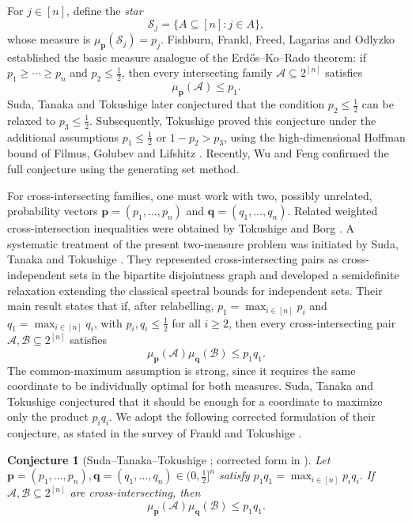 \documentclass[11pt]{article}
\numberwithin{equation}{section}
\newtheorem{conjecture}[theorem]{Conjecture}
\theoremstyle{definition}
\theoremstyle{remark}
\begin{document}
For $j\in[n]$, define the \textit{star}
$$
 \mathcal{S}_j=\{A\subseteq[n]:j\in A\},
$$
whose measure is
$
 \mu_{\mathbf p}(\mathcal{S}_j)=p_j.
$
Fishburn, Frankl, Freed, Lagarias and Odlyzko \cite{FishburnEtAl} established the basic measure analogue of the Erd\H{o}s--Ko--Rado theorem: if  $p_1\ge\cdots\ge p_n$ and $p_2\le \frac{1}{2}$, then  every intersecting family $\mathcal{A}\subseteq2^{[n]}$ satisfies
\begin{equation*}
 \mu_{\mathbf p}(\mathcal{A})\leq p_1.
\end{equation*}
Suda, Tanaka and Tokushige \cite{STT} later conjectured that the condition $p_2\le \frac{1}{2}$ can be relaxed to $p_3\le \frac{1}{2}$.  Subsequently, Tokushige \cite{T22} proved this conjecture under the additional assumptions $p_1\le\frac{1}{2}$ or $1-p_2>p_3$, using the high-dimensional Hoffman bound of Filmus, Golubev and Lifshitz \cite{F21}. Recently, Wu and Feng \cite{W26} confirmed the full conjecture using the generating set method.




For cross-intersecting families, one must work with two, possibly unrelated, probability vectors
$
 \mathbf p=(p_1,\ldots,p_n)
$
and 
$
 \mathbf q=(q_1,\ldots,q_n).
$
Related weighted cross-intersection inequalities were obtained by Tokushige \cite{Tokushige} and Borg \cite{Borg}. A systematic treatment of the present two-measure problem was initiated by Suda, Tanaka and Tokushige \cite{STT}. They represented cross-intersecting pairs as cross-independent sets in the bipartite disjointness graph and developed a semidefinite relaxation extending the classical spectral bounds for independent sets.
Their main result states that if, after relabelling, $
p_1=\max_{i\in[n]}p_i
$
and 
$q_1=\max_{i\in[n]}q_i$, with  $p_i,q_i\leq\frac{1}{2}$ for all $i\geq 2$,
then every cross-intersecting pair $\mathcal{A},\mathcal{B}\subseteq2^{[n]}$ satisfies
\begin{equation*}
 \mu_{\mathbf p}(\mathcal{A})
 \mu_{\mathbf q}(\mathcal{B})
 \leq p_1q_1.
\end{equation*}
The common-maximum assumption is strong, since it requires the same coordinate to be individually optimal for both measures. Suda, Tanaka and Tokushige \cite{STT} conjectured that it should be enough for a coordinate to maximize only the product $p_iq_i$.
We adopt the following corrected formulation of their conjecture, as stated in the survey of Frankl and Tokushige \cite[Conjecture 10.1]{FranklTokushigeSurvey}.


\begin{conjecture}[Suda--Tanaka--Tokushige \cite{STT}; corrected form in \cite{FranklTokushigeSurvey}]
\label{conj:product}
Let $\mathbf p=(p_1,\ldots,p_n), \mathbf q=(q_1,\ldots,q_n)\in(0,\frac{1}{2}]^n$ satisfy
$
 p_1q_1=\max_{i\in[n]}p_iq_i.
$
If $\mathcal{A},\mathcal{B}\subseteq2^{[n]}$ are cross-intersecting, then
$$
 \mu_{\mathbf p}(\mathcal{A})\mu_{\mathbf q}(\mathcal{B})
 \leq p_1q_1.
$$
\end{conjecture}
\end{document}
